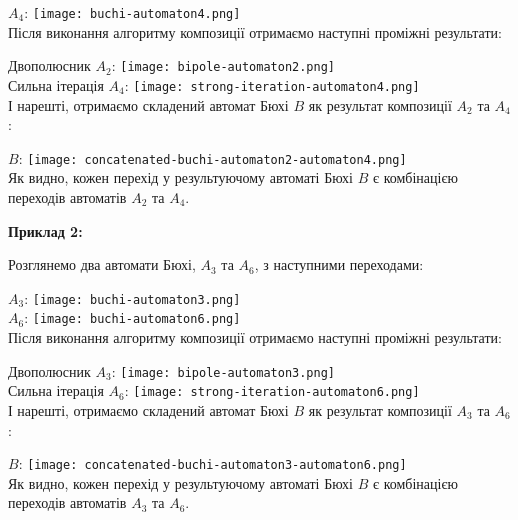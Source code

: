 \documentclass[12pt,a4paper]{article}
\begin{document}
\(A_4\):
\texttt{[image: buchi-automaton4.png]} \\

Після виконання алгоритму композиції отримаємо наступні проміжні результати:

Двополюсник \(A_2\):
\texttt{[image: bipole-automaton2.png]} \\

Сильна ітерація \(A_4\):
\texttt{[image: strong-iteration-automaton4.png]} \\

І нарешті, отримаємо складений автомат Бюхі \(B\) як результат композиції \(A_2\) та \(A_4\):

\(B\):
\texttt{[image: concatenated-buchi-automaton2-automaton4.png]} \\

Як видно, кожен перехід у результуючому автоматі Бюхі \(B\) є комбінацією переходів автоматів \(A_2\) та \(A_4\).

\newpage

\vspace{1em}
\textbf{Приклад 2:}
\vspace{0.5em}

Розглянемо два автомати Бюхі, \(A_3\) та \(A_6\), з наступними переходами:

\(A_3\):
\texttt{[image: buchi-automaton3.png]} \\

\(A_6\):
\texttt{[image: buchi-automaton6.png]} \\

Після виконання алгоритму композиції отримаємо наступні проміжні результати:

Двополюсник \(A_3\):
\texttt{[image: bipole-automaton3.png]} \\

Сильна ітерація \(A_6\):
\texttt{[image: strong-iteration-automaton6.png]} \\

І нарешті, отримаємо складений автомат Бюхі \(B\) як результат композиції \(A_3\) та \(A_6\):

\(B\):
\texttt{[image: concatenated-buchi-automaton3-automaton6.png]} \\

Як видно, кожен перехід у результуючому автоматі Бюхі \(B\) є комбінацією переходів автоматів \(A_3\) та \(A_6\).
\end{document}
